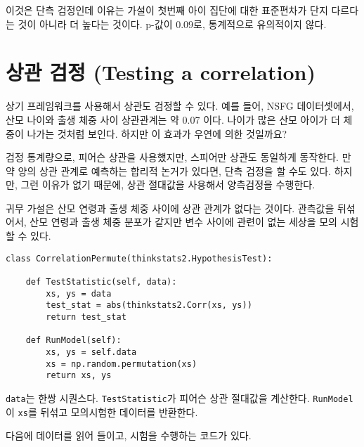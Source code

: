 이것은 단측 검정인데 이유는 가설이 첫번째 아이 집단에 대한 표준편차가 단지 다르다는 것이 아니라 더 높다는 것이다. p-값이 0.09로, 통계적으로 유의적이지 않다.



\section{상관 검정 (Testing a correlation)}
\label{corrtest}

상기 프레임워크를 사용해서 상관도 검정할 수 있다. 
예를 들어, NSFG 데이터셋에서, 산모 나이와 출생 체중 사이 상관관계는 약 0.07 이다. 
나이가 많은 산모 아이가 더 체중이 나가는 것처럼 보인다. 하지만 이 효과가 우연에 의한 것일까요?

검정 통계량으로, 피어슨 상관을 사용했지만, 스피어만 상관도 동일하게 동작한다. 만약 양의 상관 관계로 예측하는 합리적 논거가 있다면, 단측 검정을 할 수도 있다. 하지만, 그런 이유가 없기 때문에, 상관 절대값을 사용해서 양측검정을 수행한다.

귀무 가설은 산모 연령과 출생 체중 사이에 상관 관계가 없다는 것이다.
관측값을 뒤섞어서, 산모 연령과 출생 체중 분포가 같지만 변수 사이에 관련이 없는 세상을 모의 시험할 수 있다.

\begin{verbatim}
class CorrelationPermute(thinkstats2.HypothesisTest):

    def TestStatistic(self, data):
        xs, ys = data
        test_stat = abs(thinkstats2.Corr(xs, ys))
        return test_stat

    def RunModel(self):
        xs, ys = self.data
        xs = np.random.permutation(xs)
        return xs, ys
\end{verbatim}

{\tt data}는 한쌍 시퀀스다. {\tt TestStatistic}가 피어슨 상관 절대값을 계산한다. {\tt RunModel}이 {\tt xs}를 뒤섞고 모의시험한 데이터를 반환한다.

다음에 데이터를 읽어 들이고, 시험을 수행하는 코드가 있다.

